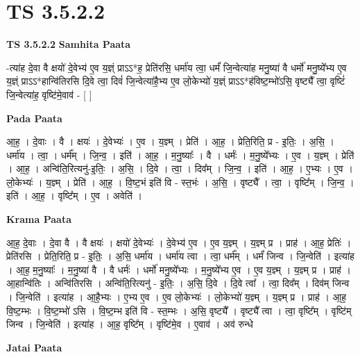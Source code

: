 \documentclass[17pt]{extarticle}
\begin{document}
\section{ TS 3.5.2.2 }

\textbf{TS 3.5.2.2 } \newline
\textbf{Samhita Paata} \newline

-त्या॑ह दे॒वा वै क्षयो॑ दे॒वेभ्य॑ ए॒व य॒ज्ञ्ं प्राऽऽ*ह॒ प्रेति॑रसि॒ धर्मा॑य त्वा॒ धर्मं॑ जि॒न्वेत्या॑ह मनु॒ष्या॑ वै धर्मो॑ मनु॒ष्ये᳚भ्य ए॒व य॒ज्ञ्ं प्राऽऽ*हान्वि॑तिरसि दि॒वे त्वा॒ दिवं॑ जि॒न्वेत्या॑है॒भ्य ए॒व लो॒केभ्यो॑ य॒ज्ञ्ं प्राऽऽ*ह॑विष्ट॒म्भो॑ऽसि॒ वृष्ट्यै᳚ त्वा॒ वृष्टिं॑ जि॒न्वेत्या॑ह॒ वृष्टि॑मे॒वाव॑ - [  ] \newline

\textbf{Pada Paata} \newline

आ॒ह॒ । दे॒वाः । वै । क्षयः॑ । दे॒वेभ्यः॑ । ए॒व । य॒ज्ञ्म् । प्रेति॑ । आ॒ह॒ । प्रेति॒रिति॒ प्र - इ॒तिः॒ । अ॒सि॒ । धर्मा॑य । त्वा॒ । धर्म᳚म् । जि॒न्व॒ । इति॑ । आ॒ह॒ । म॒नु॒ष्याः᳚ । वै । धर्मः॑ । म॒नु॒ष्ये᳚भ्यः । ए॒व । य॒ज्ञ्म् । प्रेति॑ । आ॒ह॒ । अन्वि॑ति॒रित्यनु॑-इ॒तिः॒ । अ॒सि॒ । दि॒वे । त्वा॒ । दिव᳚म् । जि॒न्व॒ । इति॑ । आ॒ह॒ । ए॒भ्यः । ए॒व । लो॒केभ्यः॑ । य॒ज्ञ्म् । प्रेति॑ । आ॒ह॒ । वि॒ष्ट॒भं इति॑ वि - स्त॒भंः । अ॒सि॒ । वृष्ट्यै᳚ । त्वा॒ । वृष्टि᳚म् । जि॒न्व॒ । इति॑ । आ॒ह॒ । वृष्टि᳚म् । ए॒व । अवेति॑ ।  \newline


\textbf{Krama Paata} \newline

आ॒ह॒ दे॒वाः । दे॒वा वै । वै क्षयः॑ । क्षयो॑ दे॒वेभ्यः॑ । दे॒वेभ्य॑ ए॒व । ए॒व य॒ज्ञ्म् । य॒ज्ञ्म् प्र । प्राह॑ । आ॒ह॒ प्रेतिः॑ । प्रेति॑रसि । प्रेति॒रिति॒ प्र - इ॒तिः॒ । अ॒सि॒ धर्मा॑य । धर्मा॑य त्वा । त्वा॒ धर्म᳚म् । धर्मं॑ जिन्व । जि॒न्वेति॑ । इत्या॑ह । आ॒ह॒ म॒नु॒ष्याः᳚ । म॒नु॒ष्या॑ वै । वै धर्मः॑ । धर्मो॑ मनु॒ष्ये᳚भ्यः । म॒नु॒ष्ये᳚भ्य ए॒व । ए॒व य॒ज्ञ्म् । य॒ज्ञ्म् प्र । प्राह॑ । आ॒हान्वि॑तिः । अन्वि॑तिरसि । अन्वि॑ति॒रित्यनु॑ - इ॒तिः॒ । अ॒सि॒ दि॒वे । दि॒वे त्वा᳚ । त्वा॒ दिव᳚म् । दिव॑म् जिन्व । जि॒न्वेति॑ । इत्या॑ह । आ॒है॒भ्यः । ए॒भ्य ए॒व । ए॒व लो॒केभ्यः॑ । लो॒केभ्यो॑ य॒ज्ञ्म् । य॒ज्ञ्म् प्र । प्राह॑ । आ॒ह॒ वि॒ष्ट॒म्भः । वि॒ष्ट॒म्भो॑ ऽसि । वि॒ष्ट॒म्भ इति॑ वि - स्त॒म्भः । अ॒सि॒ वृष्ट्यै᳚ । वृष्ट्यै᳚ त्वा । त्वा॒ वृष्टि᳚म् । वृष्टि॑म् जिन्व । जि॒न्वेति॑ । इत्या॑ह । आ॒ह॒ वृष्टि᳚म् । वृष्टि॑मे॒व । ए॒वाव॑ । अव॑ रुन्धे \newline

\textbf{Jatai Paata} \newline
\end{document}

